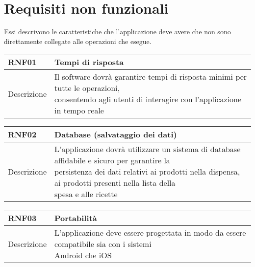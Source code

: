 \newpage

\section{Requisiti non funzionali}

Essi descrivono le caratteristiche che l'applicazione deve avere che non sono direttamente collegate alle operazioni che esegue.

\begin{table}[H]
  \begin{flushleft}
    \begin{tabular}{l|l}
      \toprule
      \textbf{RNF01} & \textbf{Tempi di risposta}\\
      \midrule
      Descrizione & \makecell{Il software dovrà garantire tempi di risposta minimi per tutte le operazioni,\\ consentendo agli utenti di interagire con l'applicazione in tempo reale}\\
      \bottomrule
    \end{tabular}
  \end{flushleft}
\end{table}

\begin{table}[H]
  \begin{flushleft}
    \begin{tabular}{l|l}
      \toprule
      \textbf{RNF02} & \textbf{Database (salvataggio dei dati)}\\
      \midrule
      Descrizione & \makecell{L'applicazione dovrà utilizzare un sistema di database affidabile e sicuro per garantire la \\ persistenza dei dati relativi ai prodotti nella dispensa, ai prodotti presenti nella lista della \\ spesa e alle ricette}\\
      \bottomrule
    \end{tabular}
  \end{flushleft}
\end{table}

\begin{table}[H]
  \begin{flushleft}
    \begin{tabular}{l|l}
      \toprule
      \textbf{RNF03} & \textbf{Portabilità}\\
      \midrule
      Descrizione & \makecell{L'applicazione deve essere progettata in modo da essere compatibile sia con i sistemi \\ Android che iOS}\\
      \bottomrule
    \end{tabular}
  \end{flushleft}
\end{table}

